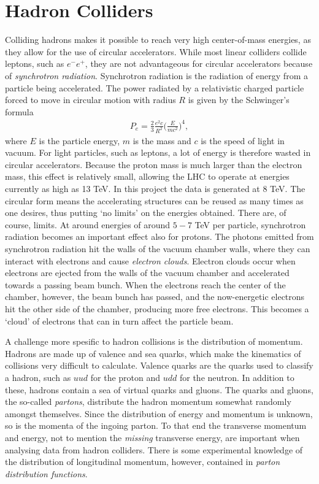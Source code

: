 \documentclass[twoside,english]{uiofysmaster}
\begin{document}
{\section{Hadron Colliders}

Colliding hadrons makes it possible to reach very high center-of-mass energies, as they allow for the use of circular accelerators. While most linear colliders collide leptons, such as $e^- e^+$, they are not advantageous for circular accelerators because of \textit{synchrotron radiation}. Synchrotron radiation is the radiation of energy from a particle being accelerated. The power radiated by a relativistic charged particle forced to move in circular motion with radius $R$ is given by the Schwinger's formula \cite{Balerna2015}
\begin{align}
P_e = \frac{2}{3} \frac{e^2c }{R^2} \Bigg( \frac{E}{mc^2} \Bigg)^4,
\end{align}
where $E$ is the particle energy, $m$ is the mass and $c$ is the speed of light in vacuum. For light particles, such as leptons, a lot of energy is therefore wasted in circular accelerators. Because the proton mass is much larger than the electron mass, this effect is relatively small, allowing the LHC to operate at energies currently as high as 13 TeV. In this project the data is generated at $8$ TeV. The circular form means the accelerating structures can be reused as many times as one desires, thus putting `no limits' on the energies obtained. There are, of course, limits. At around energies of around $5-7$ TeV per particle, synchrotron radiation becomes an important effect also for protons. The photons emitted from synchrotron radiation hit the walls of the vacuum chamber walls, where they can interact with electrons and cause \textit{electron clouds}. Electron clouds occur when electrons are ejected from the walls of the vacuum chamber and accelerated towards a passing beam bunch. When the electrons reach the center of the chamber, however, the beam bunch has passed, and the now-energetic electrons hit the other side of the chamber, producing more free electrons. This becomes a `cloud' of electrons that can in turn affect the particle beam. 

A challenge more spesific to hadron collisions is the distribution of momentum. Hadrons are made up of valence and sea quarks, which make the kinematics of collisions very difficult to calculate. Valence quarks are the quarks used to classify a hadron, such as $uud$ for the proton and $udd$ for the neutron. In addition to these, hadrons contain a sea of virtual quarks and gluons. The quarks and gluons, the so-called \textit{partons}, distribute the hadron momentum somewhat randomly amongst themselves. Since the distribution of energy and momentum is unknown, so is the momenta of the ingoing parton. To that end the transverse momentum and energy, not to mention the \textit{missing} transverse energy, are important when analysing data from hadron colliders. There is some experimental knowledge of the distribution of longitudinal momentum, however, contained in \textit{parton distribution functions}.

}
\end{document}
